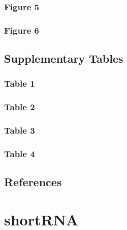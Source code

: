 \documentclass[12pt,twoside]{reedthesis}
\begin{document}
\newpage

\hypertarget{figure-5-1}{%
\subsection{Figure 5}\label{figure-5-1}}

\newpage

\hypertarget{figure-6-1}{%
\subsection{Figure 6}\label{figure-6-1}}

\newpage

\hypertarget{supplementary-tables}{%
\section{Supplementary Tables}\label{supplementary-tables}}

\hypertarget{table-1}{%
\subsection{Table 1}\label{table-1}}

\newpage

\hypertarget{table-2}{%
\subsection{Table 2}\label{table-2}}

\newpage

\hypertarget{table-3}{%
\subsection{Table 3}\label{table-3}}

\newpage

\hypertarget{table-4}{%
\subsection{Table 4}\label{table-4}}

\newpage

\hypertarget{references-1}{%
\section{References}\label{references-1}}

\hypertarget{shortRNA}{%
\chapter{shortRNA}\label{shortRNA}}
\end{document}
